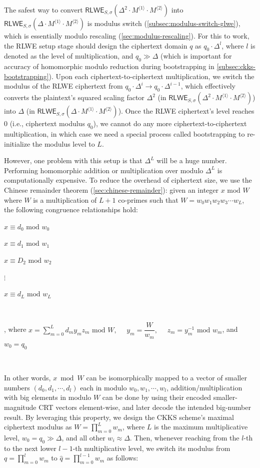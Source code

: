 The safest way to convert $\textsf{RLWE}_{S, \sigma}(\Delta^2 \cdot M^{\langle 1 \rangle} \cdot M^{\langle 2 \rangle})$ into $\textsf{RLWE}_{S, \sigma}(\Delta \cdot M^{\langle 1 \rangle} \cdot M^{\langle 2 \rangle})$ is modulus switch (\autoref{subsec:modulus-switch-glwe}), which is essentially modulo rescaling (\autoref{sec:modulus-rescaling}). For this to work, the RLWE setup stage should design the ciphertext domain $q$ as $q_0\cdot\Delta^{l}$, where $l$ is denoted as the level of multiplication, and $q_0 \gg \Delta$ (which is important for accuracy of homomorphic modulo reduction during bootstrapping in \autoref{subsec:ckks-bootstrapping}). Upon each ciphertext-to-ciphertext multiplication, we switch the modulus of the RLWE ciphertext from $q_0\cdot\Delta^{i} \rightarrow q_0\cdot\Delta^{i-1}$, which effectively converts the plaintext's squared scaling factor $\Delta^2$ (in $\textsf{RLWE}_{S, \sigma}(\Delta^2 \cdot M^{\langle 1 \rangle} \cdot M^{\langle 2 \rangle})$) into $\Delta$ (in $\textsf{RLWE}_{S, \sigma}(\Delta \cdot M^{\langle 1 \rangle} \cdot M^{\langle 2 \rangle})$). Once the RLWE ciphertext's level reaches 0 (i.e., ciphertext modulus $q_0$), we cannot do any more ciphertext-to-ciphertext multiplication, in which case we need a special process called bootstrapping to re-initialize the modulus level to $L$. 

However, one problem with this setup is that $\Delta^L$ will be a huge number. Performing homomorphic addition or multiplication over modulo $\Delta^L$ is computationally expensive. To reduce the overhead of ciphertext size, we use the Chinese remainder theorem (\autoref{sec:chinese-remainder}): given an integer $x \text{ mod } W$ where $W$ is a multiplication of $L+1$ co-primes such that $W = w_0w_1w_2w_3\cdots w_L$, the following congruence relationships hold:

$x \equiv d_0 \text{ mod } w_0$ 

$x \equiv d_1 \text{ mod } w_1$ 

$x \equiv D_2 \text{ mod } w_2$ 

$\vdots$

$x \equiv d_L \text{ mod } w_L$ 

$ $

, where $x = \sum\limits_{m=0}^{L} d_my_mz_m \text{ mod } W, \text{ } \text{ } y_m = \dfrac{W}{w_m}, \text{ } \text{ } z_m = y_m^{-1} \text{ mod } w_m$, and $w_0 = q_0$ 

$ $

In other words, $x \bmod W$ can be isomorphically mapped to a vector of smaller numbers $(d_0, d_1, \cdots, d_l)$ each in modulo $w_0, w_1, \cdots, w_l$, addition/multiplication with big elements in modulo $W$ can be done by using their encoded smaller-magnitude CRT vectors element-wise, and later decode the intended big-number result. By leveraging this property, we design the CKKS scheme's maximal ciphertext modulus as $W= \prod\limits_{m=0}^{L}w_m$, where $L$ is the maximum multiplicative level, $w_0 = q_0 \gg \Delta$, and all other $w_i \approx \Delta$. Then, whenever reaching from the $l$-th to the next lower $l-1$-th multiplicative level, we switch its modulus from $q=\prod\limits_{m=0}^{l}w_m$ to $\hat q =\prod\limits_{m=0}^{l - 1}w_m$ as follows:


